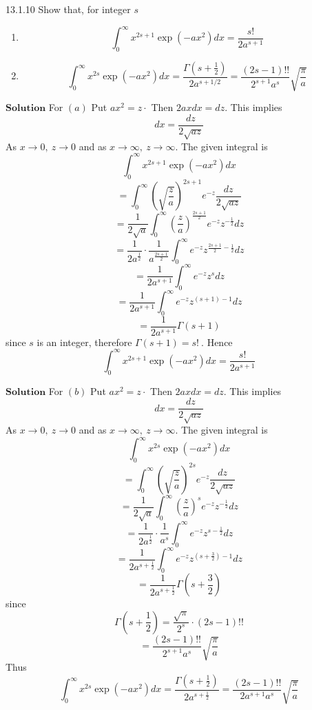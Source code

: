 \documentclass{article}
\begin{document}
\begin{flushleft}
\newpage

\begin{mybox}{13.1.10}
Show that, for integer $s$
\begin{enumerate}[$(a)$]
\item $$\int_{0}^{\infty} x^{2 s+1} \exp \left(-a x^{2}\right) d x=\frac{s!}{2 a^{s+1}}$$
\item $$\int_{0}^{\infty} x^{2 s} \exp \left(-a x^{2}\right) d x=\frac{\Gamma\left(s+\frac{1}{2}\right)}{2 a^{s+1 / 2}}=\frac{(2 s-1) ! !}{2^{s+1} a^{s}} \sqrt{\frac{\pi}{a}}$$
\end{enumerate}


\end{mybox}
$\boxed{\textbf{Solution}}$ For $(a)$ Put $a x^{2}=z \cdot$ Then $2 a x d x=d z$. This implies
$$
d x=\frac{d z}{2 \sqrt{a z}}
$$
As $x \rightarrow 0, \  z \rightarrow 0$ and as $x \rightarrow \infty, \  z \rightarrow \infty$.
The given integral is
$$
\int_{0}^{\infty} x^{2 s+1} \exp \left(-a x^{2}\right) d x
$$
$$
=\int_{0}^{\infty}\left(\sqrt{\frac{z}{a}}\right)^{2 s+1} e^{-z} \frac{d z}{2 \sqrt{a z}}
$$
$$
=\frac{1}{2 \sqrt{a}} \int_{0}^{\infty}\left(\frac{z}{a}\right)^{\frac{2 s+1}{2}} e^{-z} z^{-\frac{1}{2}} d z
$$
$$
=\frac{1}{2 a^{\frac{1}{2}}} \cdot \frac{1}{a^{\frac{2 s+1}{2}}} \int_{0}^{\infty} e^{-z} z^{\frac{2 s+1}{2}-\frac{1}{2}} d z
$$
$$
=\frac{1}{2 a^{s+1}} \int_{0}^{\infty} e^{-z} z^{s} d z
$$
$$
=\frac{1}{2 a^{s+1}} \int_{0}^{\infty} e^{-z} z^{(s+1)-1} d z
$$
$$
=\frac{1}{2 a^{s+1}} \Gamma(s+1)
$$
since $s$ is an integer, therefore $\Gamma(s+1)=s! \ $. Hence 
$$\int_{0}^{\infty} x^{2 s+1} \exp \left(-a x^{2}\right) d x=\frac{s!}{2 a^{s+1}}$$ 

$\boxed{\textbf{Solution}}$ For $(b)$ Put $a x^{2}=z \cdot$ Then $2 a x d x=d z$. This implies
$$
d x=\frac{d z}{2 \sqrt{a z}}
$$
As $x \rightarrow 0, \  z \rightarrow 0$ and as $x \rightarrow \infty, \  z \rightarrow \infty$.
The given integral is
$$
\int_{0}^{\infty} x^{2 s} \exp \left(-a x^{2}\right) d x
$$
$$
=\int_{0}^{\infty}\left(\sqrt{\frac{z}{a}}\right)^{2 s} e^{-z} \frac{d z}{2 \sqrt{a z}}
$$
$$
=\frac{1}{2 \sqrt{a}} \int_{0}^{\infty}\left(\frac{z}{a}\right)^{s} e^{-z} z^{-\frac{1}{2}} d z
$$
$$
=\frac{1}{2 a^{\frac{1}{2}}} \cdot \frac{1}{a^{s}} \int_{0}^{\infty} e^{-z} z^{s-\frac{1}{2}} d z
$$
$$
=\frac{1}{2 a^{s+\frac{1}{2}}} \int_{0}^{\infty} e^{-z} z^{\left(s+\frac{3}{2}\right)-1} d z
$$
$$
=\frac{1}{2 a^{s+\frac{1}{2}}} \Gamma\left(s+\frac{3}{2}\right)
$$
since 
$$\Gamma\left(s+\frac{1}{2}\right)=\frac{\sqrt{\pi}}{2^{s}} \cdot(2 s-1) ! !$$
$$
=\frac{(2 s-1) ! !}{2^{s+1} a^{s}} \sqrt{\frac{\pi}{a}}
$$
Thus
$$
\int_{0}^{\infty} x^{2 s} \exp \left(-a x^{2}\right) d x=\frac{\Gamma\left(s+\frac{1}{2}\right)}{2 a^{s+\frac{1}{2}}}=\frac{(2 s-1) ! !}{2 a^{s+1} a^{s}} \sqrt{\frac{\pi}{a}}
$$


\end{flushleft}
\end{document}

